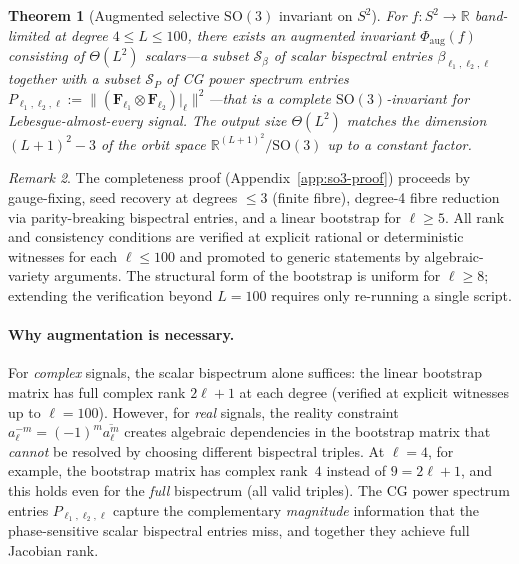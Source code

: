 \documentclass{article}
\newtheorem{theorem}{Theorem}
\theoremstyle{definition}
\theoremstyle{remark}
\newtheorem{remark}[theorem]{Remark}
\newcommand{\R}{\mathbb{R}}
\newcommand{\SO}{\mathrm{SO}}
\newcommand{\conj}[1]{\overline{#1}}
\theoremstyle{definition}
\begin{document}
\begin{theorem}[Augmented selective $\SO(3)$ invariant on $S^2$]
\label{thm:so3-selective}
For $f : S^2 \to \R$ band-limited at degree $4 \le L \le 100$, there exists an augmented
invariant $\Phi_{\mathrm{aug}}(f)$ consisting of
$\Theta(L^2)$ scalars---a subset $\mathcal{S}_\beta$ of scalar
bispectral entries $\beta_{\ell_1,\ell_2,\ell}$ together with a
subset $\mathcal{S}_P$ of CG power spectrum entries
$P_{\ell_1,\ell_2,\ell} := \lVert (\mathbf{F}_{\ell_1} \otimes
\mathbf{F}_{\ell_2})|_\ell \rVert^2$---that is a complete
$\SO(3)$-invariant for Lebesgue-almost-every signal.
The output size $\Theta(L^2)$ matches the dimension
$(L{+}1)^2 - 3$ of the orbit space $\R^{(L+1)^2}/\SO(3)$
up to a constant factor.
\end{theorem}

\begin{remark}\label{rem:verified-L}
The completeness proof (Appendix~\ref{app:so3-proof}) proceeds by
gauge-fixing, seed recovery at degrees $\le 3$ (finite fibre),
degree-4 fibre reduction via parity-breaking bispectral entries, and
a linear bootstrap for $\ell \ge 5$.
All rank and consistency conditions are verified at explicit rational
or deterministic witnesses for each $\ell \le 100$ and promoted to generic
statements by algebraic-variety arguments.
The structural form of the bootstrap is uniform for $\ell \ge 8$;
extending the verification beyond $L = 100$ requires only re-running
a single script.
\end{remark}

\paragraph{Why augmentation is necessary.}
For \emph{complex} signals, the scalar bispectrum alone suffices: the
linear bootstrap matrix has full complex rank $2\ell{+}1$ at each degree
(verified at explicit witnesses up to $\ell = 100$). However, for
\emph{real} signals, the reality constraint
$a_\ell^{-m} = (-1)^m \conj{a_\ell^m}$ creates algebraic dependencies
in the bootstrap matrix that \emph{cannot} be resolved by choosing
different bispectral triples. At $\ell = 4$, for example, the bootstrap
matrix has complex rank~$4$ instead of $9 = 2\ell{+}1$, and this holds
even for the \emph{full} bispectrum (all valid triples). The CG power
spectrum entries $P_{\ell_1,\ell_2,\ell}$ capture the complementary
\emph{magnitude} information that the phase-sensitive scalar bispectral
entries miss, and together they achieve full Jacobian rank.
\end{document}
